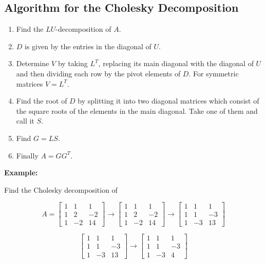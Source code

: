 \subsection{Algorithm for the Cholesky Decomposition}

\begin{enumerate}

    \item Find the \(LU\)-decomposition of \(A\). 

    \item \(D\) is given by the entries in the diagonal of \(U\). 
    
    \item Determine \(V\) by taking \(L^T\), replacing its main diagonal with the diagonal of \(U\) and then dividing each row by the pivot 
    elements of \(D\). For symmetric matrices \(V = L^T\).

    \item Find the root of \(D\) by splitting it into two diagonal matrices which consist of the square roots of the elements in the main diagonal.
    Take one of them and call it \(S\).

    \item Find \(G = LS\). 
    
    \item Finally \(A = G G^T\).

\end{enumerate}

\textbf{Example:}

Find the Cholesky decomposition of 

\[
    A = 
    \begin{bmatrix}
       1 & 1 & 1 \\ 
       1 & 2 & -2 \\ 
       1 & -2 & 14 
    \end{bmatrix}
    \rightarrow 
    \begin{bmatrix}
       1 & 1 & 1 \\ 
       1 & 2 & -2 \\ 
       1 & -2 & 14 
    \end{bmatrix}
    \rightarrow 
    \begin{bmatrix}
       1 & 1 & 1 \\ 
       1 & 1 & -3 \\ 
       1 & -3 & 13 
    \end{bmatrix}
\]

\[
    \begin{bmatrix}
       1 & 1 & 1 \\ 
       1 & 1 & -3 \\ 
       1 & -3 & 13 
    \end{bmatrix}
    \rightarrow 
    \begin{bmatrix}
       1 & 1 & 1 \\ 
       1 & 1 & -3 \\ 
       1 & -3 & 4 
    \end{bmatrix}
\]

